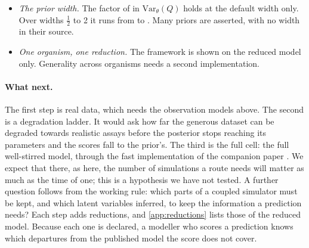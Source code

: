 \begin{itemize}
  In those cells GTP therefore falls below $K_d$, the dissociation constant of RNA
  polymerase for its nucleotides. Below $K_d$ the small elasticities behind that
  treatment do not hold (\cref{sec:modelform}). The true simulator keeps the full coupling, so
  the scores include this reduction's effect on the fit. We have not measured that effect. M0
  never enters this regime, so its calibration does not cover it.
  \item \emph{The prior width.} The factor of  in $\mathrm{Var}_\theta(Q)$ holds
  at the default width only. Over widths $\tfrac12$ to 2 it runs from  to
  . Many priors are asserted, with no width in their source.
  \item \emph{One organism, one reduction.} The framework is shown on the reduced \syn{} model
  only. Generality across organisms needs a second implementation.
\end{itemize}

\paragraph{What next.} The first step is real data, which needs the observation models above.
The second is a degradation ladder. It would ask how far the generous dataset
can be degraded towards realistic assays before the posterior stops reaching its parameters and
the scores fall to the prior's. The third is the full cell: the full well-stirred \syn{} model, through the
fast implementation of the companion paper \cite{kimpson2026whole}. We expect that there, as
here, the number of simulations a route needs will matter as much as the time of one; this is a
hypothesis we have not tested. A further question follows from the working rule: which parts
of a coupled simulator must be kept, and which latent variables inferred, to keep the
information a prediction needs? Each step adds reductions, and \cref{app:reductions} lists those
of the reduced model. Because each one is declared, a modeller who scores a prediction knows
which departures from the published model the score does not cover.
